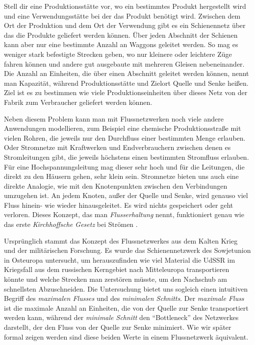 Stell dir eine Produktionsstätte vor, wo ein bestimmtes Produkt hergestellt wird und eine Verwendungsstätte bei der das Produkt benötigt wird. Zwischen dem Ort der Produktion und dem Ort der Verwendung gibt es ein Schienennetz über das die Produkte geliefert werden können. Über jeden Abschnitt der Schienen kann aber nur eine bestimmte Anzahl an Waggons geleitet werden. So mag es weniger stark befestigte Strecken geben, wo nur kleinere oder leichtere Züge fahren können und andere gut ausgebaute mit mehreren Gleisen nebeneinander. Die Anzahl an Einheiten, die über einen Abschnitt geleitet werden können, nennt man Kapazität, während Produktionsstätte und Zielort Quelle und Senke heißen. Ziel ist es zu bestimmen wie viele Produktionseinheiten über dieses Netz von der Fabrik zum Verbraucher geliefert werden können.

Neben diesem Problem kann man mit Flussnetzwerken noch viele andere Anwendungen modellieren, zum Beispiel eine chemische Produktionsstraße mit vielen Rohren, die jeweils nur den Durchfluss einer bestimmten Menge erlauben. Oder Stromnetze mit Kraftwerken und Endverbrauchern zwischen denen es Stromleitungen gibt, die jeweils höchstens einen bestimmten Stromfluss erlauben. Für eine Hochspannungsleitung mag dieser sehr hoch und für die Leitungen, die direkt zu den Häusern gehen, sehr klein sein. Stromnetze bieten uns auch eine direkte Analogie, wie mit den Knotenpunkten zwischen den Verbindungen umzugehen ist. An jedem Knoten, außer der Quelle und Senke, wird genauso viel Fluss hinein- wie wieder hinausgeleitet. Es wird nichts gespeichert oder geht verloren. Dieses Konzept, das man \emph{Flusserhaltung} nennt, funktioniert genau wie das erste \emph{Kirchhoffsche Gesetz} bei Strömen \citep{clrs09}. 

Ursprünglich stammt das Konzept des Flussnetzwerkes aus dem Kalten Krieg und der militärischen Forschung. Es wurde das Schienennetzwerk des Sowjetunion in Osteuropa untersucht, um herauszufinden wie viel Material die UdSSR im Kriegsfall aus dem russischen Kerngebiet nach Mitteleuropa transportieren könnte und welche Strecken man zerstören müsste, um den Nachschub am schnellsten Abzuschneiden. Die Untersuchung bietet uns sogleich einen intuitiven Begriff des \emph{maximalen Flusses} und des \emph{minimalen Schnitts}. Der \emph{maximale Fluss} ist die maximale Anzahl an Einheiten, die von der Quelle zur Senke transportiert werden kann, während der \emph{minimale Schnitt} den \enquote{Bottleneck} des Netzwerkes darstellt, der den Fluss von der Quelle zur Senke minimiert. Wie wir später formal zeigen werden sind diese beiden Werte in einem Flussnetzwerk äquivalent.

